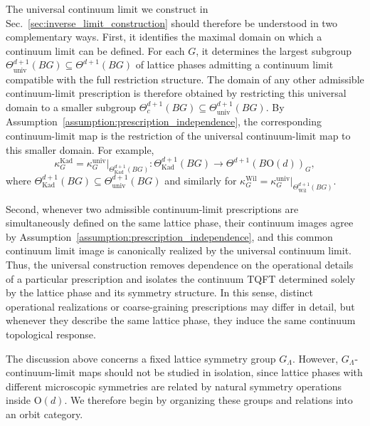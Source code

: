 \documentclass[aps,prx,reprint,superscriptaddress,twocolumn,amsmath,amssymb,amsfonts, nofootinbib]{revtex4-2}
\theoremstyle{apsstyle}
\begin{document}
\bigskip 


The universal continuum limit we construct in Sec.~\ref{sec:inverse_limit_construction}
should therefore be understood in two complementary ways. First, it identifies the maximal domain on which a continuum limit can be defined. For each $G$, it determines the largest subgroup $\Theta^{d+1}_{\mathrm{univ}}(BG)\subseteq \Theta^{d+1}(BG)$ of lattice phases admitting a continuum limit compatible with the full restriction structure. The domain of any other admissible continuum-limit prescription is therefore obtained by restricting this universal domain to a smaller subgroup $\Theta^{d+1}_{c}(BG)\subseteq \Theta^{d+1}_{\mathrm{univ}}(BG)$.  By Assumption~\ref{assumption:prescription_independence}, the corresponding continuum-limit map is the restriction of the universal continuum-limit map to this smaller domain. For example,
\begin{equation*}
\kappa_G^{\mathrm{Kad}} = \kappa_{G}^{\mathrm{univ}}
\big\vert_{\Theta^{d+1}_{\mathrm{Kad}}(BG)} :
\Theta^{d+1}_{\mathrm{Kad}}(BG) \longrightarrow \Theta^{d+1}(B\mathrm{O}(d))_G,
\end{equation*}
where $\Theta^{d+1}_{\mathrm{Kad}}(BG)\subseteq \Theta^{d+1}_{\mathrm{univ}}(BG)$ and similarly for $\kappa_{G}^{\mathrm{Wil}}=\kappa_{G}^{\mathrm{univ}}\vert_{\Theta^{d+1}_{\mathrm{Wil}}(BG)}$. 

\medskip

Second, whenever two admissible continuum-limit prescriptions are simultaneously defined on the same lattice phase, their continuum images agree by Assumption~\ref{assumption:prescription_independence}, and this common continuum limit image is canonically realized by the universal continuum limit. Thus, the universal construction removes dependence on the operational details of a particular prescription and isolates the continuum TQFT determined solely by the lattice phase and its symmetry structure. In this sense, distinct operational realizations or coarse-graining prescriptions may differ in detail, but whenever they describe the same lattice phase, they induce the same continuum topological response.

\bigskip 

The discussion above concerns a fixed lattice symmetry group $G_{\Lambda}$. However, $G_{\Lambda}$-continuum-limit maps should not be studied in isolation, since lattice phases with different microscopic symmetries are related by natural symmetry operations inside $\mathrm{O}(d)$. We therefore begin by organizing these groups and relations into an orbit category.
\end{document}
